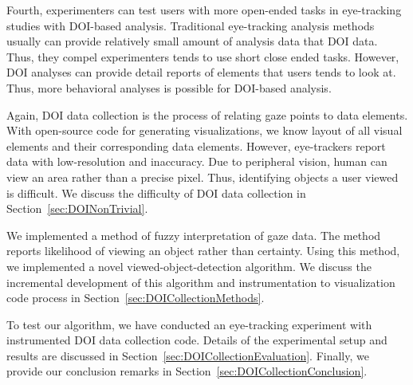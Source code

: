 Fourth, experimenters can test users with more open-ended tasks in eye-tracking studies with DOI-based analysis. Traditional eye-tracking analysis methods usually can provide relatively small amount of analysis data that DOI data. Thus, they compel experimenters tends to use short close ended tasks. However, DOI analyses can provide detail reports of elements that users tends to look at. Thus, more behavioral analyses is possible for DOI-based analysis. 

Again, DOI data collection is the process of relating gaze points to data elements. With open-source code for generating visualizations, we know layout of all visual elements and their corresponding data elements. However, eye-trackers report data with low-resolution and inaccuracy. Due to peripheral vision, human can view an area rather than a precise pixel. Thus, identifying objects a user viewed is difficult. We discuss the difficulty of DOI data collection in Section~\ref{sec:DOINonTrivial}. 

We implemented a method of fuzzy interpretation of gaze data. The method reports likelihood of viewing an object rather than certainty. Using this method, we implemented a novel viewed-object-detection algorithm. We discuss the incremental development of this algorithm and instrumentation to visualization code process in Section~\ref{sec:DOICollectionMethods}. 

To test our algorithm, we have conducted an eye-tracking experiment with instrumented DOI data collection code. Details of the experimental setup and results are discussed in Section~\ref{sec:DOICollectionEvaluation}. Finally, we provide our conclusion remarks in Section~\ref{sec:DOICollectionConclusion}.